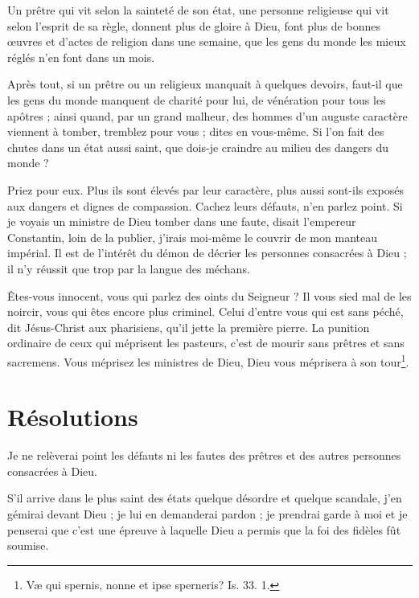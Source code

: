 \documentclass[instructions.tex]{subfiles}
\begin{document}
Un prêtre qui vit selon la sainteté de son état, une personne religieuse qui vit selon l'esprit de sa règle, donnent plus de gloire à Dieu, font plus de bonnes œuvres et d'actes de religion dans une semaine, que les gens du monde les mieux réglés n'en font dans un mois.
 
Après tout, si un prêtre ou un religieux manquait à quelques devoirs, faut-il que les gens du monde manquent de charité pour lui, de vénération pour tous les apôtres ; ainsi quand, par un grand malheur, des hommes d'un auguste caractère viennent à tomber, tremblez pour vous ; dites en vous-même. Si l'on fait des chutes dans un état aussi saint, que dois-je craindre au milieu des dangers du monde ?
 
Priez pour eux. Plus ils sont élevés par leur caractère, plus aussi sont-ils exposés aux dangers et dignes de compassion. Cachez leurs défauts, n'en parlez point. Si je voyais un ministre de Dieu tomber dans une faute, disait l'empereur Constantin, loin de la publier, j'irais moi-même le couvrir de mon manteau impérial. Il est de l'intérêt du démon de décrier les personnes consacrées à Dieu ; il n'y réussit que trop par la langue des méchans.
 
Êtes-vous innocent, vous qui parlez des oints du Seigneur ? Il vous sied mal de les noircir, vous qui êtes encore plus criminel. Celui d'entre vous qui est sans péché, dit Jésus-Christ aux pharisiens, qu'il jette la première pierre. La punition ordinaire de ceux qui méprisent les pasteurs, c'est de mourir sans prêtres et sans sacremens. Vous méprisez les ministres de Dieu, Dieu vous méprisera à son tour\footnote{Væ qui spernis, nonne et ipse sperneris? Is. 33. 1.}.
 
\section{Résolutions}
 
\primo Je ne relèverai point les défauts ni les fautes des prêtres et des autres personnes consacrées à Dieu.

\secundo S'il arrive dans le plus saint des états quelque désordre et quelque scandale, j'en gémirai devant Dieu ; je lui en demanderai pardon ; je prendrai garde à moi et je penserai que c'est une épreuve à laquelle Dieu a permis que la foi des fidèles fût soumise. 

 
\end{document}
